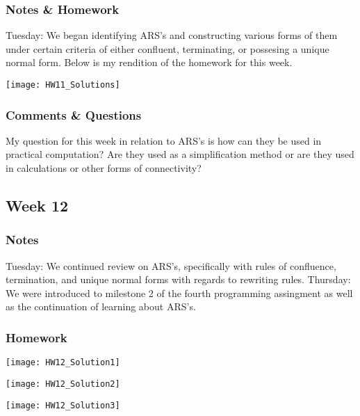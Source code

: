 \documentclass{article}
\theoremstyle{theorem}
\theoremstyle{definition}
\theoremstyle{remark}
\begin{document}
\subsubsection{Notes \& Homework}

Tuesday: We began identifying ARS's and constructing various forms of them under certain criteria of either confluent, terminating, or possesing a unique normal form. Below is my rendition of the homework for this week.

\graphicspath{ {C:/Users/jrmul/OneDrive/Documents/CPSC_Courses/CPSC_354/images/} }
\begin{center} \texttt{[image: HW11\_Solutions]} \end{center}

\subsubsection{Comments \& Questions}

My question for this week in relation to ARS's is how can they be used in practical computation? Are they used as a simplification method or are they used in calculations or other forms of connectivity? 

\subsection{Week 12}

\subsubsection{Notes}
Tuesday: We continued review on ARS's, specifically with rules of confluence, termination, and unique normal forms with regards to rewriting rules.
\newline
Thursday: We were introduced to milestone 2 of the fourth programming assingment as well as the continuation of learning about ARS's.

\subsubsection{Homework}
\graphicspath{ {C:/Users/jrmul/OneDrive/Documents/CPSC_Courses/CPSC_354/images/} }
\begin{center} \texttt{[image: HW12\_Solution1]} \end{center}
\begin{center} \texttt{[image: HW12\_Solution2]} \end{center}
\begin{center} \texttt{[image: HW12\_Solution3]} \end{center}
\end{document}
